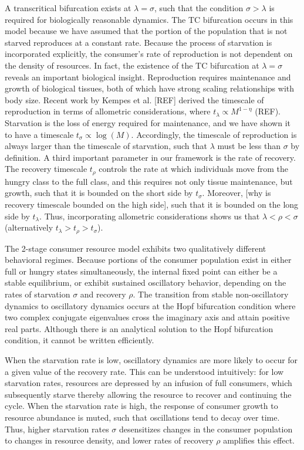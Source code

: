 \documentclass[12pt,english]{article}
\begin{document}
\begin{spacing}{1.9}
A transcritical bifurcation exists at $\lambda = \sigma$, such that the condition $\sigma > \lambda$ is required for biologically reasonable dynamics.
The TC bifurcation occurs in this model because we have assumed that the portion of the population that is not starved reproduces at a constant rate.
Because the process of starvation is incorporated explicitly, the consumer's rate of reproduction is not dependent on the density of resources.
In fact, the existence of the TC bifurcation at $\lambda = \sigma$ reveals an important biological insight. 
Reproduction requires maintenance and growth of biological tissues, both of which have strong scaling relationships with body size.
Recent work by Kempes et al. [REF] derived the timescale of reproduction in terms of allometric considerations, where $t_\lambda \propto M^{1-\eta}$ (REF).
Starvation is the loss of energy required for maintenance, and we have shown it to have a timescale $t_\sigma \propto \log(M)$.
Accordingly, the timescale of reproduction is always larger than the timescale of starvation, such that $\lambda$ must be less than $\sigma$ by definition.
A third important parameter in our framework is the rate of recovery.
The recovery timescale $t_\rho$ controls the rate at which individuals move from the hungry class to the full class, and this requires not only tissue maintenance, but growth, such that it is bounded on the short side by $t_\sigma$.
Moreover, [why is recovery timescale bounded on the high side], such that it is bounded on the long side by $t_\lambda$.
Thus, incorporating allometric considerations shows us that $\lambda < \rho < \sigma$ (alternatively $t_\lambda > t_\rho > t_\sigma$).

The 2-stage consumer resource model exhibits two qualitatively different behavioral regimes.
Because portions of the consumer population exist in either full or hungry states simultaneously, the internal fixed point can either be a stable equilibrium, or exhibit sustained oscillatory behavior, depending on the rates of starvation $\sigma$ and recovery $\rho$.
The transition from stable non-oscillatory dynamics to oscillatory dynamics occurs at the Hopf bifurcation condition where two complex conjugate eigenvalues cross the imaginary axis and attain positive real parts.
Although there is an analytical solution to the Hopf bifurcation condition, it cannot be written efficiently.

When the starvation rate is low, oscillatory dynamics are more likely to occur for a given value of the recovery rate.
This can be understood intuitively: for low starvation rates, resources are depressed by an infusion of full consumers, which subsequently starve thereby allowing the resource to recover and continuing the cycle.
When the starvation rate is high, the response of consumer growth to resource abundance is muted, such that oscillations tend to decay over time.
Thus, higher starvation rates $\sigma$ desensitizes changes in the consumer population to changes in resource density, and lower rates of recovery $\rho$ amplifies this effect.


\end{spacing}
\end{document}
